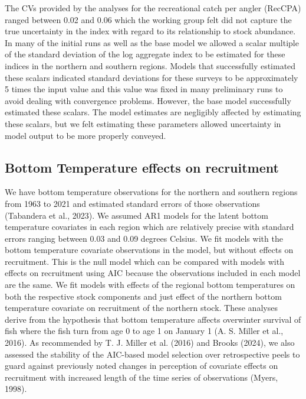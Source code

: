 \documentclass[
]{article}
\begin{document}
The CVs provided by the analyses for the recreational catch per angler (RecCPA) ranged between 0.02 and 0.06 which the working group felt did not capture the true uncertainty in the index with regard to its relationship to stock abundance. In many of the initial runs as well as the base model we allowed a scalar multiple of the standard deviation of the log aggregate index to be estimated for these indices in the northern and southern regions. Models that successfully estimated these scalars indicated standard deviations for these surveys to be approximately 5 times the input value and this value was fixed in many preliminary runs to avoid dealing with convergence problems. However, the base model successfully estimated these scalars. The model estimates are negligibly affected by estimating these scalars, but we felt estimating these parameters allowed uncertainty in model output to be more properly conveyed.

\hypertarget{bottom-temperature-effects-on-recruitment}{%
\subsection{Bottom Temperature effects on recruitment}\label{bottom-temperature-effects-on-recruitment}}

We have bottom temperature observations for the northern and southern regions from 1963 to 2021 and estimated standard errors of those observations (Tabandera et al., 2023). We assumed AR1 models for the latent bottom temperature covariates in each region which are relatively precise with standard errors ranging between 0.03 and 0.09 degrees Celsius. We fit models with the bottom temperature covariate observations in the model, but without effects on recruitment. This is the null model which can be compared with models with effects on recruitment using AIC because the observations included in each model are the same. We fit models with effects of the regional bottom temperatures on both the respective stock components and just effect of the northern bottom temperature covariate on recruitment of the northern stock. These analyses derive from the hypothesis that bottom temperature affects overwinter survival of fish where the fish turn from age 0 to age 1 on January 1 (A. S. Miller et al., 2016). As recommended by T. J. Miller et al. (2016) and Brooks (2024), we also assessed the stability of the AIC-based model selection over retrospective peels to guard against previously noted changes in perception of covariate effects on recruitment with increased length of the time series of observations (Myers, 1998).
\end{document}
